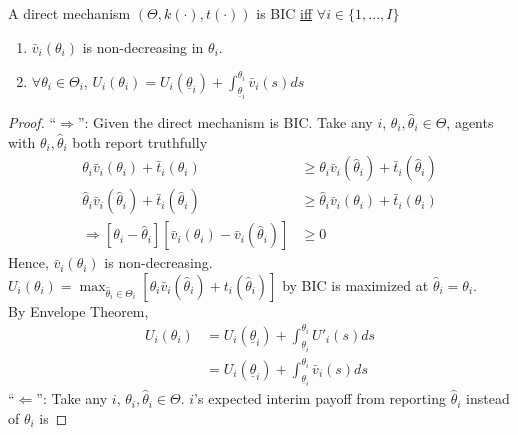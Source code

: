 \documentclass[11pt]{elegantbook}
\begin{document}
\begin{proposition}\label{Linear utility model_BIC}
    A direct mechanism $\left(\Theta,k(\cdot),t(\cdot)\right)$ is BIC \underline{iff} $\forall i\in\{1,...,I\}$
    \begin{enumerate}[(1).]
        \item $\bar{v}_i(\theta_i)$ is non-decreasing in $\theta_i$.
        \item $\forall \theta_i\in\Theta_i$, $U_i(\theta_i)=U_i(\underline{\theta}_i)+\int_{\underline{\theta}_i}^{\theta_i}\bar{v}_i(s)ds$
    \end{enumerate}
\end{proposition}
\begin{proof}
    ``$\Rightarrow$'': Given the direct mechanism is BIC. Take any $i$, $\theta_i,\hat{\theta}_i\in\Theta$, agents with $\theta_i,\hat{\theta}_i$ both report truthfully
    \begin{equation}
        \begin{aligned}
            \theta_i \bar{v}_i(\theta_i)+\bar{t}_i(\theta_i)&\geq \theta_i \bar{v}_i(\hat{\theta}_i)+\bar{t}_i(\hat{\theta}_i)\\
            \hat{\theta}_i \bar{v}_i(\hat{\theta}_i)+\bar{t}_i(\hat{\theta}_i)&\geq \hat{\theta}_i \bar{v}_i(\theta_i)+\bar{t}_i(\theta_i)\\
            \Rightarrow [\theta_i-\hat{\theta}_i][\bar{v}_i(\theta_i)-\bar{v}_i(\hat{\theta}_i)]&\geq 0
        \end{aligned}
        \nonumber
    \end{equation}
    Hence, $\bar{v}_i(\theta_i)$ is non-decreasing.\\
    $U_i(\theta_i)=\max_{\hat{\theta}_i\in\Theta_i}\left[\theta_i\bar{v}_i(\hat{\theta}_i)+t_i(\hat{\theta}_i)\right]$ by BIC is maximized at $\hat{\theta}_i=\theta_i$.\\
    By Envelope Theorem,
    \begin{equation}
        \begin{aligned}
            U_i(\theta_i)&=U_i(\underline{\theta}_i)+\int_{\underline{\theta}_i}^{\theta_i}U'_i(s)ds\\
            &=U_i(\underline{\theta}_i)+\int_{\underline{\theta}_i}^{\theta_i}\bar{v}_i(s)ds
        \end{aligned}
        \nonumber
    \end{equation}
    ``$\Leftarrow$'': Take any $i$, $\theta_i,\hat{\theta}_i\in\Theta$. $i$'s expected interim payoff from reporting $\hat{\theta}_i$ instead of $\theta_i$ is

\end{proof}
\end{document}
